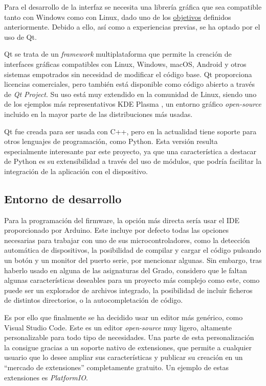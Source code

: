 Para el desarrollo de la interfaz se necesita una librería gráfica que sea compatible tanto con Windows como con Linux, dado uno de los \hyperref[sec:objetivos]{objetivos} definidos anteriormente. Debido a ello, así como a experiencias previas, se ha optado por el uso de Qt.

Qt se trata de un \textit{framework} multiplataforma que permite la creación de interfaces gráficas compatibles con Linux, Windows, macOS, Android y otros sistemas empotrados sin necesidad de modificar el código base. Qt proporciona licencias comerciales, pero también está disponible como código abierto a través de \textit{Qt Project}. Su uso está muy extendido en la comunidad de Linux, siendo uno de los ejemplos más representativos KDE Plasma \cite{kde-plasma}, un entorno gráfico \textit{open-source} incluido en la mayor parte de las distribuciones más usadas.

Qt fue creada para ser usada con C++, pero en la actualidad tiene soporte para otros lenguajes de programación, como Python. Esta versión resulta especialmente interesante par este proyecto, ya que una característica a destacar de Python es su extensibilidad a través del uso de módulos, que podría facilitar la integración de la aplicación con el dispositivo.

\subsection{Entorno de desarrollo}

Para la programación del firmware, la opción más directa sería usar el IDE proporcionado por Arduino. Este incluye por defecto todas las opciones necesarias para trabajar con uno de sus microcontroladores, como la detección automática de dispositivos, la posibilidad de compilar y cargar el código pulsando un botón y un monitor del puerto serie, por mencionar algunas. Sin embargo, tras haberlo usado en alguna de las asignaturas del Grado, considero que le faltan algunas características deseables para un proyecto más complejo como este, como puede ser un explorador de archivos integrado, la posibilidad de incluir ficheros de distintos directorios, o la autocompletación de código.

Es por ello que finalmente se ha decidido usar un editor más genérico, como Visual Studio Code. Este es un editor \textit{open-source} muy ligero, altamente personalizable para todo tipo de necesidades. Una parte de esta personalización la consigue gracias a un soporte nativo de extensiones, que permite a cualquier usuario que lo desee ampliar sus características y publicar su creación en un ``mercado de extensiones'' completamente gratuito. Un ejemplo de estas extensiones es \textit{PlatformIO}.

